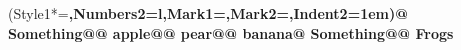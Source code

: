 \documentclass[preview]{standalone}
\begin{document}
\begin{center}
\begin{easylist}\ListProperties(Style1*=\bfseries,Numbers2=l,Mark1={},Mark2={},Indent2=1em)@ Something@@ apple@@ pear@@ banana@ Something@@ Frogs\end{easylist}
\end{center}
\end{document}
